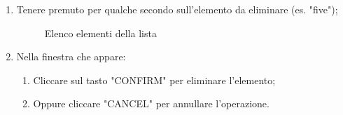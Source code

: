 \begin{itemize}
\begin{enumerate}
		\item Tenere premuto per qualche secondo sull'elemento da eliminare (es. "five");
		\begin{figure}[!ht]
			\centering
			\caption{Elenco elementi della lista}
		\end{figure}
		\newpage
		\item Nella finestra che appare:
		\begin{enumerate}
			\item Cliccare sul tasto "CONFIRM" per eliminare l'elemento;
			\item Oppure cliccare "CANCEL" per annullare l'operazione.
		\end{enumerate}

\end{enumerate}
\end{itemize}
